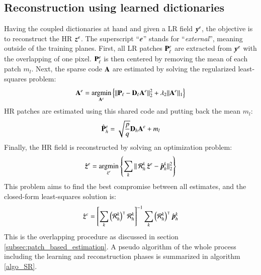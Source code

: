 \subsection{Reconstruction using learned dictionaries}
Having the coupled dictionaries at hand and given a LR field $ \operatorname{\boldsymbol{y}}^{e} $, the objective is to reconstruct the HR $ \operatorname{\boldsymbol{z}}^{e} $. The superscript ``$ {e} $'' stands for ``\textit{external}'', meaning outside of the training planes. First, all LR patches $ \mathbf{P}^{e}_\ell$ are extracted from $ \operatorname{\boldsymbol{y}}^{e} $ with the overlapping of one pixel. $ \mathbf{P}^{e}_\ell$ is then centered by removing the mean of each patch $ m_l $. Next, the sparse code $ \mathbf{A} $ are estimated by solving the regularized least-squares problem:
\begin{equation}
\mathbf{A}^{e} =\operatorname*{\arg\!\min}_{\mathbf{A}^{e}} \left\lbrace \Vert \mathbf{P}_\ell-\mathbf{D}_\ell \mathbf{A}^{e}\Vert^2_2 + \lambda_2 \Vert \mathbf{A}^{e} \Vert_1 \right\rbrace 
\label{eq:DLrec1}
\end{equation}
HR patches are estimated using this shared code and putting back the mean $ m_l $:
\begin{equation}
\hat{\mathbf{P}}^{e}_h = \sqrt{\frac{p}{q}} \mathbf{D}_h \mathbf{A}^{e} + m_l
\label{eq:DLrec2}
\end{equation}
Finally, the HR field is reconstructed by solving an optimization problem:
\begin{equation}
\hat{\operatorname{\boldsymbol{z}}}^{e} = \operatorname*{\arg\!\min}_{\operatorname{\boldsymbol{z}}^{e}} \left\lbrace\sum\limits_{k} \Arrowvert \operatorname{\mathit{\mathcal{R}_h^{k}}}\hat{\operatorname{\boldsymbol{z}}}^{e}- \hat{\operatorname{\boldsymbol{p}}}_h^k\Arrowvert^2_2 \right\rbrace
\label{eq:DLrec3}
\end{equation}
This problem aims to find the best compromise between all estimates, and the closed-form least-squares solution is:
\begin{equation}
\hat{\operatorname{\boldsymbol{z}}}^{e}= \left[ \sum\limits_{k} \left(\operatorname{\mathit{\mathcal{R}_h^{k}}}\right)^{\intercal}\operatorname{\mathit{\mathcal{R}_h^{k}}}\right]^{-1}\sum\limits_{k} \left(\operatorname{\mathit{\mathcal{R}_h^{k}}}\right)^{\intercal}\hat{\operatorname{\boldsymbol{p}}}_h^k
\label{eq:DLrec4}
\end{equation}
This is the overlapping procedure as discussed in section \ref{subsec:patch_based_estimation}. A pseudo algorithm of the whole process including the learning and reconstruction phases is summarized in algorithm \ref{algo_SR}.

